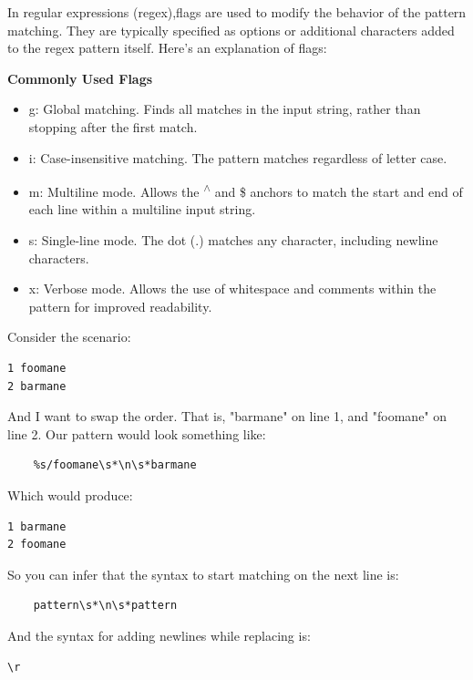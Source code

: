\documentclass{report}
\begin{document}
    \pagebreak
    \bigbreak
    \noindent

    \bigbreak \noindent 
    In regular expressions (regex),flags are used to modify the behavior of the pattern matching. They are typically specified as options or additional characters added to the regex pattern itself. Here's an explanation of flags:

    \bigbreak \noindent 
    \textbf{Commonly Used Flags}
    \begin{itemize}
        \item g: Global matching. Finds all matches in the input string, rather than stopping after the first match.
        \item i: Case-insensitive matching. The pattern matches regardless of letter case.
        \item m: Multiline mode. Allows the \textsuperscript{$\wedge$} and \$ anchors to match the start and end of each line within a multiline input string.
        \item s: Single-line mode. The dot (.) matches any character, including newline characters.
        \item x: Verbose mode. Allows the use of whitespace and comments within the pattern for improved readability.
    \end{itemize}

    \bigbreak \noindent 
    

    \pagebreak \bigbreak \noindent
    \bigbreak \noindent 
    Consider the scenario:
    \begin{verbatim}
1 foomane
2 barmane
    \end{verbatim}
    \bigbreak \noindent 
    And I want to swap the order. That is, "barmane" on line 1, and "foomane" on line 2. Our pattern would look something like:
    \begin{verbatim}
    %s/foomane\s*\n\s*barmane
    \end{verbatim}
    \bigbreak \noindent 
    Which would produce:
    \begin{verbatim}
1 barmane
2 foomane
    \end{verbatim}
    So you can infer that the syntax to start matching on the next line is:
    \begin{verbatim}
    pattern\s*\n\s*pattern
    \end{verbatim}
    And the syntax for adding newlines while replacing is:
    \begin{verbatim}
\r
    \end{verbatim}




    
\end{document}
